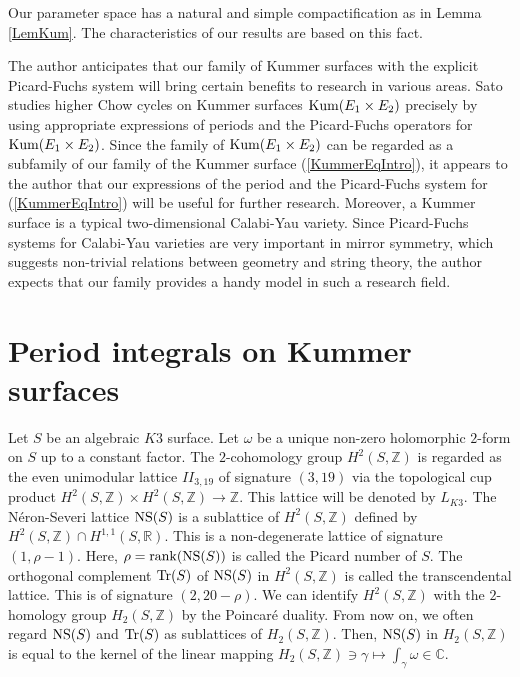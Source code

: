 \documentclass[10pt]{article}
\begin{document}
Our parameter space has a natural and simple compactification as in Lemma \ref{LemKum}.
The characteristics of our results are based on this fact.

The author anticipates that our  family of Kummer surfaces with the explicit Picard-Fuchs system will bring certain benefits to research in various areas.
Sato \cite{S} studies higher Chow cycles on Kummer surfaces ${\rm Kum}(E_1 \times E_2)$ precisely by using appropriate expressions of  periods and the Picard-Fuchs operators for ${\rm Kum}(E_1 \times E_2)$.
Since the family of ${\rm Kum}(E_1 \times E_2)$ can be regarded as a subfamily of our family of the Kummer surface (\ref{KummerEqIntro}),
it appears to the author  that our expressions of the period and the Picard-Fuchs system  for (\ref{KummerEqIntro}) will be useful for further research.
Moreover, a Kummer surface is a typical two-dimensional Calabi-Yau variety.
Since Picard-Fuchs systems for Calabi-Yau varieties are very important in mirror symmetry,
which suggests non-trivial relations between geometry and string theory,
the author expects that our family provides a handy model in such a research field.



\section{Period integrals on Kummer surfaces}

Let $S$ be an algebraic $K3$ surface.
Let $\omega$ be a unique non-zero holomorphic $2$-form on $S$ up to a constant factor.
The $2$-cohomology group $H^2(S,\mathbb{Z})$ is regarded as  the even unimodular lattice $II_{3,19}$ of signature $(3,19)$
via the topological cup product $H^2(S,\mathbb{Z}) \times H^2(S,\mathbb{Z}) \rightarrow \mathbb{Z}$. 
This lattice will be denoted by $L_{K3}$.
The N\'eron-Severi lattice ${\rm NS}(S)$ is  a sublattice of $H^2(S,\mathbb{Z})$ defined by $H^2(S,\mathbb{Z}) \cap H^{1,1}(S,\mathbb{R})$.
This is a non-degenerate lattice of signature $(1,\rho-1)$.
Here, $\rho={\rm rank}({\rm NS}(S))$ is called the Picard number of $S$.
The orthogonal complement ${\rm Tr}(S)$ of ${\rm NS}(S)$ in $H^2(S,\mathbb{Z})$ is called the transcendental lattice.
This is of signature $(2,20-\rho)$.
We can identify $H^2(S,\mathbb{Z})$ with the $2$-homology group $H_2(S,\mathbb{Z})$ by the Poincar\'e duality.
From now on, we often regard ${\rm NS}(S)$ and ${\rm Tr}(S)$ as sublattices of $H_2(S,\mathbb{Z})$.
Then, ${\rm NS}(S)$ in $H_2(S,\mathbb{Z})$ is equal to the kernel of the linear mapping $H_2(S,\mathbb{Z})\ni \gamma \mapsto \int_\gamma \omega\in \mathbb{C}$.
\end{document}
